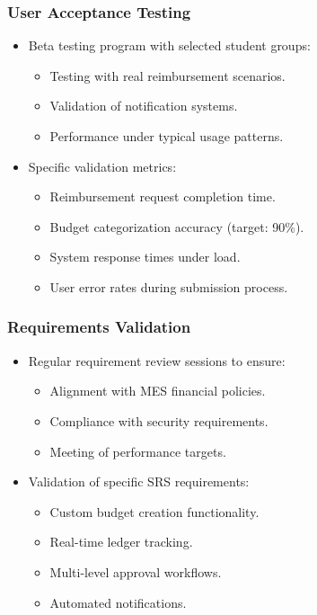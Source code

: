 \documentclass[12pt, titlepage]{article}
\begin{document}
\subsubsection*{User Acceptance Testing}
\begin{itemize}
   \item Beta testing program with selected student groups:
   \begin{itemize}
       \item Testing with real reimbursement scenarios.
       \item Validation of notification systems.
       \item Performance under typical usage patterns.
   \end{itemize}
   \item Specific validation metrics:
   \begin{itemize}
       \item Reimbursement request completion time.
       \item Budget categorization accuracy (target: 90\%).
       \item System response times under load.
       \item User error rates during submission process.
   \end{itemize}
\end{itemize}

\subsubsection*{Requirements Validation}
\begin{itemize}
   \item Regular requirement review sessions to ensure:
   \begin{itemize}
       \item Alignment with MES financial policies.
       \item Compliance with security requirements.
       \item Meeting of performance targets.
   \end{itemize}
   \item Validation of specific SRS requirements:
   \begin{itemize}
       \item Custom budget creation functionality.
       \item Real-time ledger tracking.
       \item Multi-level approval workflows.
       \item Automated notifications.
   \end{itemize}
\end{itemize}
\end{document}
